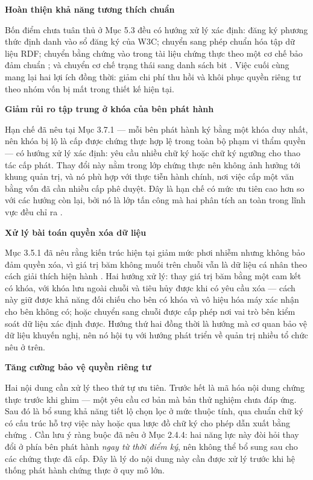 \noindent \textbf{Hoàn thiện khả năng tương thích chuẩn}

Bốn điểm chưa tuân thủ ở Mục 5.3 đều có hướng xử lý xác định: đăng ký phương thức định danh vào sổ đăng ký của W3C; chuyển sang phép chuẩn hóa tập dữ liệu RDF; chuyển bằng chứng vào trong tài liệu chứng thực theo một cơ chế bảo đảm chuẩn \cite{W3C_VCDataIntegrity2025}; và chuyển cơ chế trạng thái sang danh sách bit \cite{W3C_BitstringStatusList2025}. Việc cuối cùng mang lại hai lợi ích đồng thời: giảm chi phí thu hồi và khôi phục quyền riêng tư theo nhóm vốn bị mất trong thiết kế hiện tại.

\noindent \textbf{Giảm rủi ro tập trung ở khóa của bên phát hành}

Hạn chế đã nêu tại Mục 3.7.1 --- mỗi bên phát hành ký bằng một khóa duy nhất, nên khóa bị lộ là cấp được chứng thực hợp lệ trong toàn bộ phạm vi thẩm quyền --- có hướng xử lý xác định: yêu cầu nhiều chữ ký hoặc chữ ký ngưỡng cho thao tác cấp phát. Thay đổi này nằm trong lớp chứng thực nên không ảnh hưởng tới khung quản trị, và nó phù hợp với thực tiễn hành chính, nơi việc cấp một văn bằng vốn đã cần nhiều cấp phê duyệt. Đây là hạn chế có mức ưu tiên cao hơn so với các hướng còn lại, bởi nó là lớp tấn công mà hai phân tích an toàn trong lĩnh vực đều chỉ ra \cite{Baldi2019, Zonneveld2026}.

\noindent \textbf{Xử lý bài toán quyền xóa dữ liệu}

Mục 3.5.1 đã nêu rằng kiến trúc hiện tại giảm mức phơi nhiễm nhưng không bảo đảm quyền xóa, vì giá trị băm không muối trên chuỗi vẫn là dữ liệu cá nhân theo cách giải thích hiện hành \cite{EDPB2025}. Hai hướng xử lý: thay giá trị băm bằng một cam kết có khóa, với khóa lưu ngoài chuỗi và tiêu hủy được khi có yêu cầu xóa --- cách này giữ được khả năng đối chiếu cho bên có khóa và vô hiệu hóa máy xác nhận cho bên không có; hoặc chuyển sang chuỗi được cấp phép nơi vai trò bên kiểm soát dữ liệu xác định được. Hướng thứ hai đồng thời là hướng mà cơ quan bảo vệ dữ liệu khuyến nghị, nên nó hội tụ với hướng phát triển về quản trị nhiều tổ chức nêu ở trên.

\noindent \textbf{Tăng cường bảo vệ quyền riêng tư}

Hai nội dung cần xử lý theo thứ tự ưu tiên. Trước hết là mã hóa nội dung chứng thực trước khi ghim --- một yêu cầu cơ bản mà bản thử nghiệm chưa đáp ứng. Sau đó là bổ sung khả năng tiết lộ chọn lọc ở mức thuộc tính, qua chuẩn chữ ký có cấu trúc hỗ trợ việc này \cite{RFC9901} hoặc qua lược đồ chữ ký cho phép dẫn xuất bằng chứng \cite{Looker_BBS2025}. Cần lưu ý ràng buộc đã nêu ở Mục 2.4.4: hai năng lực này đòi hỏi thay đổi ở phía bên phát hành \emph{ngay từ thời điểm ký}, nên không thể bổ sung sau cho các chứng thực đã cấp. Đây là lý do nội dung này cần được xử lý trước khi hệ thống phát hành chứng thực ở quy mô lớn.

